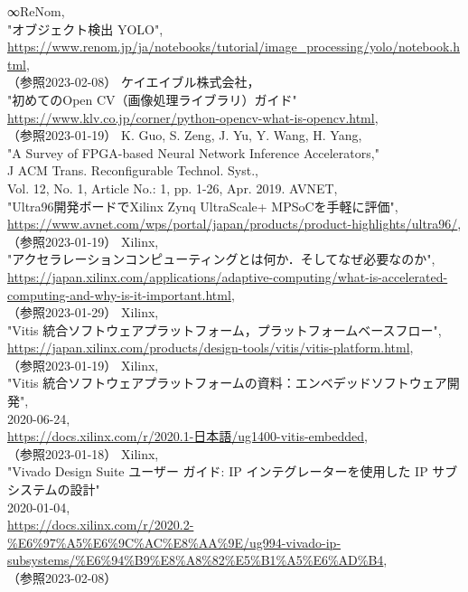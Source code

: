 \documentclass[11pt,a4j]{jreport}
\begin{document}
\begin{thebibliography}{99}
   ∞ReNom, \\"オブジェクト検出 YOLO", \\\url{https://www.renom.jp/ja/notebooks/tutorial/image_processing/yolo/notebook.html}, \\（参照2023-02-08）
   ケイエイブル株式会社， \\"初めてのOpen CV（画像処理ライブラリ）ガイド" \\\url{https://www.klv.co.jp/corner/python-opencv-what-is-opencv.html}, \\（参照2023-01-19）
   K. Guo, S. Zeng, J. Yu, Y. Wang, H. Yang, \\"A Survey of FPGA-based Neural Network Inference Accelerators," \\J ACM Trans. Reconfigurable Technol. Syst., \\Vol. 12, No. 1, Article No.: 1, pp. 1-26, Apr. 2019. 
   AVNET, \\"Ultra96開発ボードでXilinx Zynq UltraScale+ MPSoCを手軽に評価", \\\url{https://www.avnet.com/wps/portal/japan/products/product-highlights/ultra96/}, \\（参照2023-01-19）
   Xilinx, \\"アクセラレーションコンピューティングとは何か．そしてなぜ必要なのか", \\\url{https://japan.xilinx.com/applications/adaptive-computing/what-is-accelerated-computing-and-why-is-it-important.html}, \\（参照2023-01-29）
   Xilinx, \\"Vitis 統合ソフトウェアプラットフォーム，プラットフォームベースフロー", \\\url{https://japan.xilinx.com/products/design-tools/vitis/vitis-platform.html}, \\（参照2023-01-19）
   Xilinx, \\"Vitis 統合ソフトウェアプラットフォームの資料：エンベデッドソフトウェア開発", \\2020-06-24, \\\url{https://docs.xilinx.com/r/2020.1-日本語/ug1400-vitis-embedded}, \\（参照2023-01-18）
   Xilinx, \\"Vivado Design Suite ユーザー ガイド: IP インテグレーターを使用した IP サブシステムの設計" \\2020-01-04, \\\url{https://docs.xilinx.com/r/2020.2-%E6%97%A5%E6%9C%AC%E8%AA%9E/ug994-vivado-ip-subsystems/%E6%94%B9%E8%A8%82%E5%B1%A5%E6%AD%B4}, \\（参照2023-02-08）

\end{thebibliography}
\end{document}
